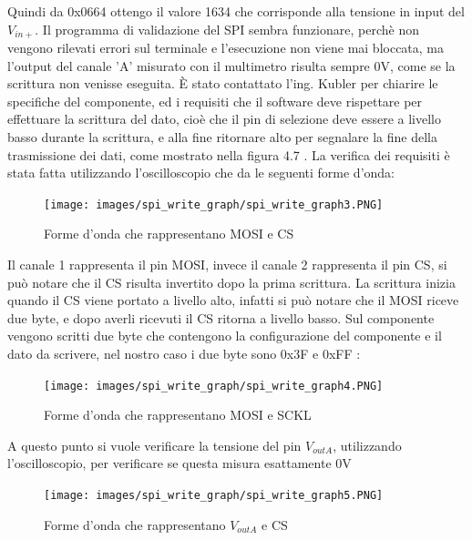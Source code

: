 \documentclass[12pt, a4paper, titlepage, oneside]{book}
\begin{document}
Quindi da 0x0664 ottengo il valore 1634 che corrisponde alla tensione in input del $V_{in+}$.\newline
Il programma di validazione del SPI sembra funzionare, perchè non vengono rilevati errori sul terminale e l'esecuzione non viene mai bloccata, ma l'output del canale 'A'  misurato con il multimetro risulta sempre 0V, come se la scrittura non venisse eseguita.\newline
È stato contattato l'ing. Kubler per chiarire le specifiche del componente, ed i requisiti che il software deve rispettare per effettuare la scrittura del dato, cioè che il pin di selezione deve essere a livello basso durante la scrittura, e alla fine ritornare alto per segnalare la fine della trasmissione dei dati, come mostrato nella figura 4.7 .\newline
La verifica dei requisiti è stata fatta utilizzando l'oscilloscopio che da le seguenti forme d'onda:\newline
\begin{figure}[h]
    \centering
    \texttt{[image: images/spi\_write\_graph/spi\_write\_graph3.PNG]}
    \caption{Forme d'onda che rappresentano MOSI e CS}
    \label{fig:spi_graph1}
\end{figure}
\newline
Il canale 1 rappresenta il pin MOSI, invece il canale 2 rappresenta il pin CS, si può notare che il CS risulta invertito dopo la prima scrittura. La scrittura inizia quando il CS viene portato a livello alto, infatti si può notare che il MOSI riceve due byte, e dopo averli ricevuti il CS ritorna a livello basso.\newline
\newpage
Sul componente vengono scritti due byte che contengono la configurazione del componente e il dato da scrivere, nel nostro caso i due byte sono 0x3F e 0xFF :
\begin{figure}[h]
    \centering
    \texttt{[image: images/spi\_write\_graph/spi\_write\_graph4.PNG]}
    \caption{Forme d'onda che rappresentano MOSI e SCKL}
    \label{fig:spi_graph2}
\end{figure}
\newpage
A questo punto si vuole verificare la tensione del pin $V_{outA}$, utilizzando l'oscilloscopio, per verificare se questa misura esattamente 0V \newline
\begin{figure}[h]
    \centering
    \texttt{[image: images/spi\_write\_graph/spi\_write\_graph5.PNG]}
    \caption{Forme d'onda che rappresentano $V_{outA}$ e CS}
    \label{fig:spi_graph2}
\end{figure}
\end{document}
